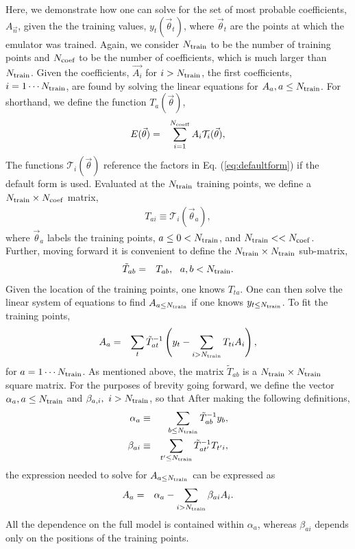 \documentclass[UserManual.tex]{subfiles}
\begin{document}
Here, we demonstrate how one can solve for the set of most probable coefficients, $A_{\vec{n}}$, given the the training values, $y_t(\vec{\theta}_t)$, where $\vec{\theta}_t$ are the points at which the emulator was trained. Again, we consider $N_{\rm train}$ to be the number of training points and $N_{\rm coef}$ to be the number of coefficients, which is much larger than $N_{\rm train}$. Given the coefficients, $\vec{A_i}$ for $i>N_{\rm train}$, the first coefficients, $i=1\cdots N_{\rm train}$, are found by solving the linear equations for $A_a, a\le N_{\rm train}$. For shorthand, we define the function $T_a(\vec{\theta})$,
\begin{eqnarray}
E(\vec{\theta})&=&\sum_{i=1}^{N_{\rm coeff}}A_i\mathcal{T}_i(\vec{\theta}),
\end{eqnarray}
The functions $\mathcal{T}_i(\vec{\theta})$ reference the factors in Eq. (\ref{eq:defaultform}) if the default form is used. Evaluated at the $N_{\rm train}$ training points, we define a $N_{\rm train}\times N_{\rm coef}$ matrix,
\begin{eqnarray}
T_{ai}\equiv\mathcal{T}_i(\vec{\theta}_a),
\end{eqnarray}
where $\vec{\theta}_a$ labels the training points, $a\le 0<N_{\rm train}$, and $N_{\rm train}<<N_{\rm coef}$. Further, moving forward it is convenient to define the $N_{\rm train}\times N_{\rm train}$ sub-matrix,
\begin{eqnarray}
\tilde{T}_{ab}&=&T_{ab},~~a,b<N_{\rm train}.
\end{eqnarray}
Given the location of the training points, one knows $T_{ta}$. One can then solve the linear system of equations to find $A_{a\le N_{\rm train}}$ if one knows $y_{t\le N_{\rm train}}$. To fit the training points,
\begin{eqnarray}
\label{eq:AofTA}
A_{a}&=&\sum_t \tilde{T}^{-1}_{at}\left(y_t-\sum_{i>N_{\rm train}}T_{ti}A_i\right),
\end{eqnarray}
for $a=1\cdots N_{\rm train}$. As mentioned above, the matrix $\tilde{T}_{ab}$ is a $N_{\rm train}\times N_{\rm train}$ square matrix. For the purposes of brevity going forward, we define the vector $\alpha_a, a\le N_{\rm train}$ and $\beta_{a,i},~i>N_{\rm train}$, so that
After making the following definitions,
\begin{eqnarray}
\alpha_a&\equiv&\sum_{b\le N_{\rm train}}\tilde{T}^{-1}_{ab}y_b,\\
\nonumber
\beta_{ai}&\equiv& \sum_{t'\le N_{\rm train}}\tilde{T}_{at'}^{-1}T_{t'i},
\end{eqnarray}
the expression needed to solve for $A_{a\le N_{\rm train}}$ can be expressed as
\begin{eqnarray}
\label{eq:AofTAalphabeta}
A_{a}&=&\alpha_a-\sum_{i>N_{\rm train}}\beta_{ai}A_i.
\end{eqnarray}
All the dependence on the full model is contained within $\alpha_a$, whereas $\beta_{ai}$ depends only on the positions of the training points.
\end{document}
